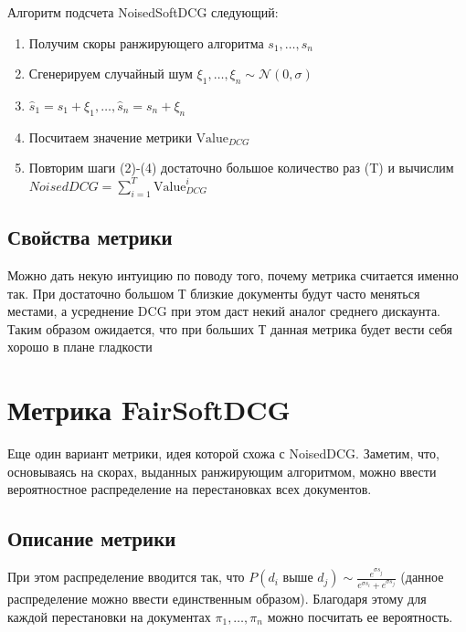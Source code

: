 \documentclass[14pt,a4paper]{amsart}
\theoremstyle{definition}
\theoremstyle{definition}
\newcommand{\N}{\mathcal{N}}
\newcommand{\Sum}{\sum\limits}
\renewcommand\t{\text}
\begin{document}
Алгоритм подсчета NoisedSoftDCG следующий:

\begin{enumerate}
\item Получим скоры ранжирующего алгоритма $s_1,\dots,s_n$
\item Сгенерируем случайный шум $\xi_1,\dots,\xi_n \sim \N(0,\sigma)$
\item $\hat{s}_1=s_1 + \xi_1,\dots,\hat{s}_n=s_n + \xi_n$
\item Посчитаем значение метрики $\t{Value}_{DCG}$
\item Повторим шаги (2)-(4) достаточно большое количество раз (T) и вычислим 
$NoisedDCG = \Sum_{i=1}^T \t{Value}_{DCG}^i$
\end{enumerate}

\subsection{Свойства метрики}

Можно дать некую интуицию по поводу того, почему метрика считается именно так. При достаточно большом Т близкие документы будут часто меняться местами, а усреднение DCG при этом даст некий аналог среднего дискаунта. Таким образом ожидается, что при больших Т данная метрика будет вести себя хорошо в плане гладкости  



\newpage
\section{Метрика FairSoftDCG}

Еще один вариант метрики, идея которой схожа с NoisedDCG. Заметим, что, основываясь на скорах, выданных ранжирующим алгоритмом, можно ввести вероятностное распределение на перестановках всех документов. \\

\subsection{Описание метрики}

При этом распределение вводится так, что 
$P(d_i \t{ выше } d_j) \sim \frac{e^{\sigma s_j}}{e^{\sigma s_i} + e^{\sigma s_j}}$ (данное распределение можно ввести единственным образом). Благодаря этому для каждой перестановки на документах $\pi_1,\dots,\pi_n$ можно посчитать ее вероятность.
\end{document}
